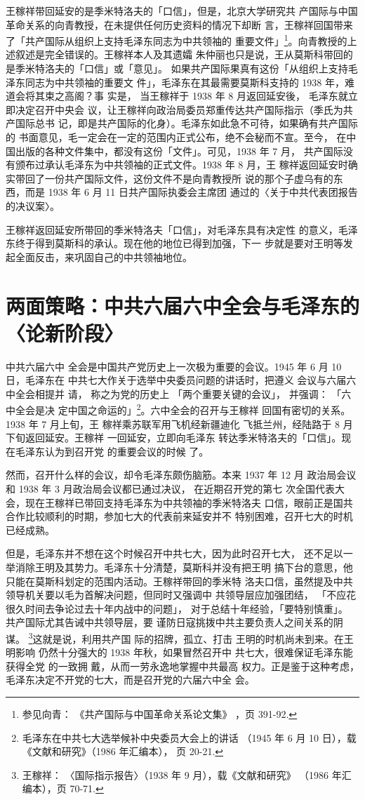 王稼祥带回延安的是季米特洛夫的「口信」，但是，北京大学研究共
产国际与中国革命关系的向青教授，在未提供任何历史资料的情况下却断
言，王稼祥回国带来了「共产国际从组织上支持毛泽东同志为中共领袖的
重要文件」\footnote{参见向青：
《共产国际与中国革命关系论文集》
，页 391-92.}。向青教授的上述叙述是完全错误的。王稼祥本人及其遗孀
朱仲丽也只是说，王从莫斯科带回的是季米特洛夫的「口信」或「意见」。
如果共产国际果真有这份「从组织上支持毛泽东同志为中共领袖的重要文
件」，毛泽东在其最需要莫斯科支持的 1938 年，难道会将其束之高阁？事
实是，
当王稼祥于 1938 年 8 月返回延安後，
毛泽东就立即决定召开中央会
议，让王稼祥向政治局委员郑重传达共产国际指示（季氏为共产国际总书
记，即是共产国际的化身）。毛泽东如此急不可待，如果确有共产国际的
书面意见，毛一定会在一定的范围内正式公布，绝不会秘而不宣。至今，
在中国出版的各种文件集中，都没有这份「文件」。可见，1938 年 7 月，
共产国际没有颁布过承认毛泽东为中共领袖的正式文件。1938 年 8 月，王
稼祥返回延安时确实带回了一份共产国际文件，这份文件不是向青教授所
说的那个子虚乌有的东西，而是 1938 年 6 月 11 日共产国际执委会主席团
通过的〈关于中共代表团报告的决议案〉。

王稼祥返回延安所带回的季米特洛夫「口信」，对毛泽东具有决定性
的意义，毛泽东终于得到莫斯科的承认。现在他的地位已得到加强，下一
步就是要对王明等发起全面反击，来巩固自己的中共领袖地位。
 
\section{两面策略：中共六届六中全会与毛泽东的〈论新阶段〉} 中共六届六中
全会是中国共产党历史上一次极为重要的会议。1945 年 6 月 10 日，毛泽东在
中共七大作关于选举中央委员问题的讲话时，把遵义 会议与六届六中全会相提并
请， 称之为党的历史上 「两个重要关键的会议」， 并强调： 「六中全会是决
定中国之命运的」\footnote{毛泽东在中共七大选举候补中央委员大会上的讲话
（1945 年 6 月 10 日），载《文献和研究》（1986 年汇编本）， 页
20-21.}。六中全会的召开与王稼祥 回国有密切的关系。1938 年 7 月上旬，王
稼祥乘苏联军用飞机经新疆迪化 飞抵兰州，经陆路于 8 月下旬返回延安。王稼祥
一回延安，立即向毛泽东 转达季米特洛夫的「口信」。现在毛泽东认为到召开党
的重要会议的时候 了。

然而，召开什么样的会议，却令毛泽东颇伤脑筋。本来 1937 年 12 月
政治局会议和 1938 年 3 月政治局会议都已通过决议，
在近期召开党的第七
次全国代表大会，现在王稼祥已带回支持毛泽东为中共领袖的季米特洛夫
口信，眼前正是国共合作比较顺利的时期，参加七大的代表前来延安并不
特别困难，召开七大的时机已经成熟。

但是，毛泽东并不想在这个时候召开中共七大，因为此时召开七大， 还不足以一
举消除王明及其势力。毛泽东十分清楚，莫斯科并没有把王明 搞下台的意思，他
只能在莫斯科划定的范围内活动。王稼祥带回的季米特 洛夫口信，虽然提及中共
领导机关要以毛为首解决问题，但同时又强调中 共领导层应加强团结， 「不应花
很久时间去争论过去十年内战中的问题」， 对于总结十年经验，「要特别慎重」。
共产国际尤其告诫中共领导层，要 谨防日寇挑拨中共主要负责人之间关系的阴谋。
\footnote{王稼祥： 〈国际指示报告〉（1938 年 9 月），载《文献和研究》
（1986 年汇编本），页 70-71.}这就是说，利用共产国 际的招牌，孤立、打击
王明的时机尚未到来。在王明影响 仍然十分强大的 1938 年秋，如果冒然召开中
共七大，很难保证毛泽东能获得全党 的一致拥 戴，从而一劳永逸地掌握中共最高
权力。正是鉴于这种考虑，毛泽东决定不开党的七大，而是召开党的六届六中全
会。

